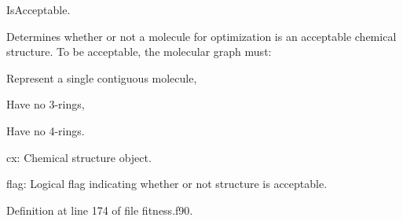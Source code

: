 Is\+Acceptable. 

Determines whether or not a molecule for optimization is an acceptable chemical structure. To be acceptable, the molecular graph must\+:
\begin{DoxyItemize}
\item Represent a single contiguous molecule,
\item Have no 3-\/rings,
\item Have no 4-\/rings.
\item cx\+: Chemical structure object.
\item flag\+: Logical flag indicating whether or not structure is acceptable. 
\end{DoxyItemize}

Definition at line 174 of file fitness.\+f90.

